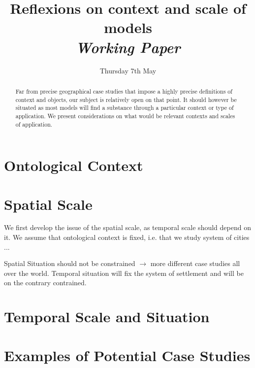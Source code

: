 


\title{Reflexions on context and scale of models\bigskip\\
\textit{Working Paper}
}
\author{}
\date{Thursday 7th May}


\maketitle

\justify


\begin{abstract}
Far from precise geographical case studies that impose a highly precise definitions of context and objects, our subject is relatively open on that point. It should however be situated as most models will find a substance through a particular context or type of application. We present considerations on what would be relevant contexts and scales of application.
\end{abstract}



\section*{Ontological Context}


\section*{Spatial Scale}

We first develop the issue of the spatial scale, as temporal scale should depend on it. We assume that ontological context is fixed, i.e. that we study system of cities ...


Spatial Situation should not be constrained $\rightarrow$ more different case studies all over the world. Temporal situation will fix the system of settlement and will be on the contrary contrained.


\section*{Temporal Scale and Situation}


\section*{Examples of Potential Case Studies}














